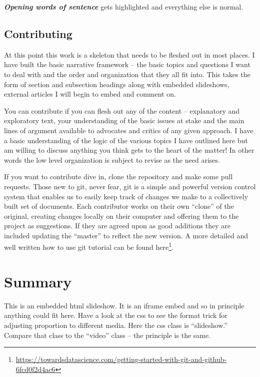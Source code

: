 \documentclass[
  12pt, openany]{book}
\renewcommand{\href}[2]{#2\footnote{\url{#1}}}
\begin{document}
\textbf{\emph{Opening words of sentence}} gets highlighted and everything else is normal.

\hypertarget{contributing}{%
\subsection{Contributing}\label{contributing}}

At this point this work is a skeleton that needs to be fleshed out in most places. I have built the basic narrative framework -- the basic topics and questions I want to deal with and the order and organization that they all fit into. This takes the form of section and subsection headings along with embedded slideshows, external articles I will begin to embed and comment on.

You can contribute if you can flesh out any of the content -- explanatory and exploratory text, your understanding of the basic issues at stake and the main lines of argument available to advocates and critics of any given approach. I have a basic understanding of the logic of the various topics I have outlined here but am willing to discuss anything you think gets to the heart of the matter! In other words the low level organization is subject to revise as the need arises.

If you want to contribute dive in, clone the repository and make some pull requests. Those new to git, never fear, git is a simple and powerful version control system that enables us to easily keep track of changes we make to a collectively built set of documents. Each contributor works on their own ``clone'' of the original, creating changes locally on their computer and offering them to the project as suggestions. If they are agreed upon as good additions they are included updating the ``master'' to reflect the new version. A more detailed and well written how to use \href{https://towardsdatascience.com/getting-started-with-git-and-github-6fcd0f2d4ac6}{git tutorial can be found here}.

\hypertarget{summary}{%
\section*{Summary}\label{summary}}


This is an embedded html slideshow. It is an iframe embed and so in principle anything could fit here. Have a look at the css to see the format trick for adjusting proportion to different media. Here the css class is ``slideshow.'' Compare that class to the ``video'' class -- the principle is the same.
\end{document}
